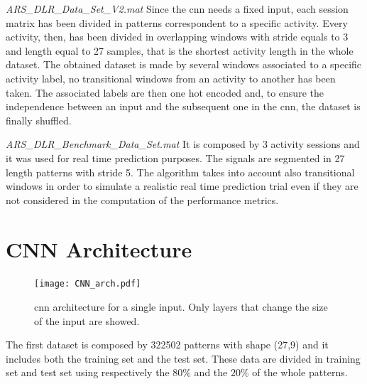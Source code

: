 \begin{LaTeXdescription}
	\item[\textit{ARS\_DLR\_Data\_Set\_V2.mat}]
		Since the \gls{cnn} needs a fixed input, each session matrix has been divided in patterns correspondent to a specific activity.
		Every activity, then, has been divided in overlapping windows with stride equals to 3 and length equal to 27 samples, that is the shortest activity length in the whole dataset. The obtained dataset is made by several windows associated to a specific activity label, no transitional windows from an activity to another has been taken. The associated labels are then one hot encoded and, to ensure the independence between an input and the subsequent one in the \gls{cnn}, the dataset is finally shuffled.

	\item[\textit{ARS\_DLR\_Benchmark\_Data\_Set.mat}]
		It is composed by 3 activity sessions and it was used for real time prediction purposes. The signals are segmented in 27 length patterns with stride 5. The algorithm takes into account also transitional windows in order to simulate a realistic real time prediction trial even if they are not considered in the computation of the performance metrics.
\end{LaTeXdescription}




\section{CNN Architecture}
\label{sec:cnn_architecture}

\begin{figure}[htp]
\texttt{[image: CNN\_arch.pdf]}
\caption{\gls{cnn} architecture for a single input. Only layers that change the size of the input are showed.}
\label{fig:CNN}
\end{figure}


The first dataset is composed by 322502 patterns with shape (27,9) and it includes both the training set and the test set. These data are divided in training set and test set using respectively the $80\%$ and the $20\%$  of the whole patterns.

